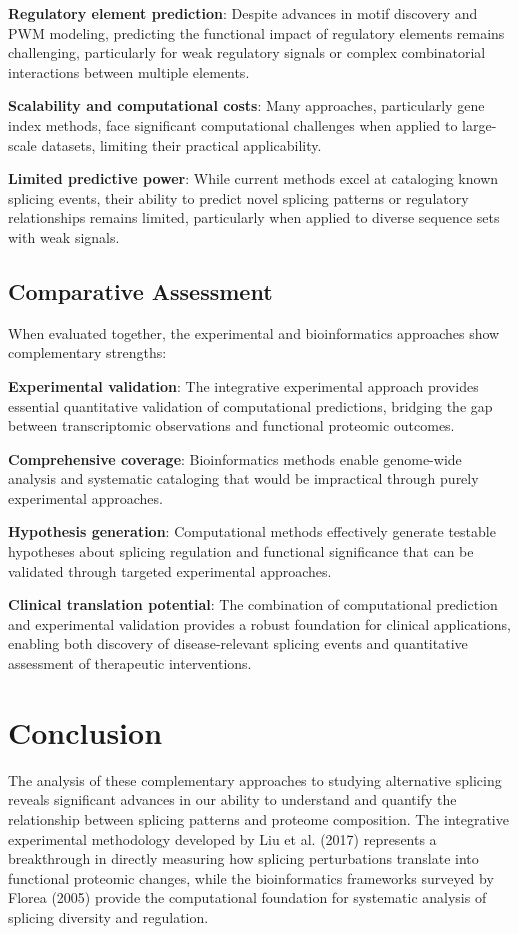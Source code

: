 \documentclass[12pt,a4paper]{article}
\begin{document}
\textbf{Regulatory element prediction}: Despite advances in motif discovery and PWM modeling, predicting the functional impact of regulatory elements remains challenging, particularly for weak regulatory signals or complex combinatorial interactions between multiple elements.

\textbf{Scalability and computational costs}: Many approaches, particularly gene index methods, face significant computational challenges when applied to large-scale datasets, limiting their practical applicability.

\textbf{Limited predictive power}: While current methods excel at cataloging known splicing events, their ability to predict novel splicing patterns or regulatory relationships remains limited, particularly when applied to diverse sequence sets with weak signals.

\subsection{Comparative Assessment}

When evaluated together, the experimental and bioinformatics approaches show complementary strengths:

\textbf{Experimental validation}: The integrative experimental approach provides essential quantitative validation of computational predictions, bridging the gap between transcriptomic observations and functional proteomic outcomes.

\textbf{Comprehensive coverage}: Bioinformatics methods enable genome-wide analysis and systematic cataloging that would be impractical through purely experimental approaches.

\textbf{Hypothesis generation}: Computational methods effectively generate testable hypotheses about splicing regulation and functional significance that can be validated through targeted experimental approaches.

\textbf{Clinical translation potential}: The combination of computational prediction and experimental validation provides a robust foundation for clinical applications, enabling both discovery of disease-relevant splicing events and quantitative assessment of therapeutic interventions.

\section{Conclusion}

The analysis of these complementary approaches to studying alternative splicing reveals significant advances in our ability to understand and quantify the relationship between splicing patterns and proteome composition. The integrative experimental methodology developed by Liu et al. (2017) represents a breakthrough in directly measuring how splicing perturbations translate into functional proteomic changes, while the bioinformatics frameworks surveyed by Florea (2005) provide the computational foundation for systematic analysis of splicing diversity and regulation.
\end{document}

